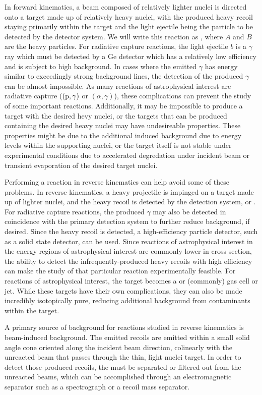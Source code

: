 In forward kinematics, a beam composed of relatively lighter nuclei
is directed onto a target made up of relatively heavy nuclei, with the produced
heavy recoil staying primarily within the target and the light ejectile being
the particle to be detected by the detector system. We will write this reaction
as , where $A$ and $B$ are the heavy particles. For radiative
capture reactions, the light ejectile $b$ is a $\gamma$ ray which must be
detected by a Ge detector which has a relatively low efficiency and is subject
to high background. In cases where the emitted $\gamma$ has energy similar to
exceedingly strong background lines, the detection of the produced $\gamma$ can
be almost impossible. As many reactions of astrophysical interest are radiative
capture ($(\rm{p},\gamma)$ or $(\alpha,\gamma)$), these complications can
prevent the study of some important reactions. Additionally, it may be
impossible to produce a target with the desired hevy nuclei, or the targets
that can be produced containing the desired heavy nuclei may have undesireable
properties. These properties might be due to the additional induced background
due to energy levels within the supporting nuclei, or the target itself is not
stable under experimental conditions due to accelerated degredation under
incident beam or transient evaporation of the desired target nuclei.

Performing a reaction in reverse kinematics can help avoid some of these
problems. In reverse kinematics, a heavy projectile is impinged on a target
made up of lighter nuclei, and the heavy recoil is detected by the detection
system, or . For radiative capture reactions, the produced
$\gamma$ may also be detected in coincidence with the primary detection system
to further reduce background, if desired. Since the heavy recoil is detected, a
high-efficiency particle detector, such as a solid state detector, can be used.
Since reactions of astrophysical interest in the energy regions of
astrophysical interest are commonly lower in cross section, the ability to
detect the infrequently-produced heavy recoils with high efficiency can make
the study of that particular reaction experimentally feasible. For reactions of
astrophysical interest, the target becomes a  or 
(commonly) gas cell or jet. While these targets have their own complications,
they can also be made incredibly isotopically pure, reducing additional
background from contaminants within the target.

A primary source of background for reactions studied in reverse kinematics is
beam-induced background. The emitted recoils are emitted within a small solid
angle cone oriented along the incident beam direction, colinearly with the
unreacted beam that passes through the thin, light nuclei target. In order to
detect those produced recoils, the must be separated or filtered out from the
unreacted beams, which can be accomplished through an electromagnetic separator
such as a spectrograph or a recoil mass separator.


